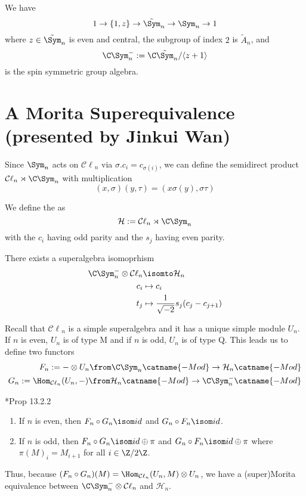 \documentclass[11pt,leqno,oneside]{amsbook}
\renewcommand{\H}{\mathcal{H}}
\newcommand{\Cl}{\mathcal{C\ell}} %
\numberwithin{thm}{section}
\begin{document}
\begin{example}
  We have \[
    1 \to \{1,z\} \to \tilde{\Sym}_n \to \Sym_n \to 1
  \]
  where \(z \in \tilde{\Sym}_n\) is even and central, the subgroup of
  index \(2\) is \(\tilde{A}_n\), and \[
    \C\Sym_n^- := \C \tilde{\Sym}_n/\langle z+1 \rangle
  \]
  is the spin symmetric group algebra.
\end{example}
\section{A Morita Superequivalence (presented by Jinkui Wan)}
Since \(\Sym_n\) acts on \(\Cl_n\) via \(\sigma.c_i = c_{\sigma(i)}\),
we can define the semidirect product \(\Cl_n \rtimes \C \Sym_n\) with
multiplication \[
  (x,\sigma)(y,\tau) = (x \sigma(y), \sigma \tau)
\]
\begin{defn}
  We define the  as \[
    \H := \Cl_n \rtimes \C \Sym_n
  \]
  with the \(c_i\) having odd parity and the \(s_j\) having even
  parity. 
\end{defn}
\begin{lem}
  There exists a superalgebra isomoprhism
  \begin{align*}
    \C\Sym_n^- \otimes \Cl_n & \isomto \H_n\\
    c_i & \mapsto c_i \\
    t_j & \mapsto \frac{1}{\sqrt{-2}} s_j(c_j-c_{j+1})
  \end{align*}
\end{lem}
Recall that \(\Cl_n\) is a simple superalgebra and it has a unique
simple module \(U_n\). If \(n\) is even, \(U_n\) is of type M and
if \(n\) is odd, \(U_n\) is of type Q. This leads us to define two
functors
\begin{align*}
  F_n := - \otimes U_n \from \C\Sym_n\catname{-Mod} \to
  \H_n\catname{-Mod}\\
  G_n := \Hom_{\Cl_n}(U_n,-) \from \H_n\catname{-Mod} \to \C\Sym_n^-\catname{-Mod}
\end{align*}
\begin{lem}
  \cite{kleshchev}*{Prop 13.2.2}
  \begin{enumerate}
  \item If \(n\) is even, then \(F_n \circ G_n \isom id\) and \(G_n
    \circ F_n \isom id\).
  \item If \(n\) is odd, then \(F_n \circ G_n \isom id \oplus \pi\)
    and \(G_n \circ F_n \isom id \oplus \pi\) where \(\pi(M)_i =
    M_{i+1}\) for all \(i \in \Z/2\Z\). 
  \end{enumerate}
\end{lem}
Thus, because \((F_n \circ G_n)(M) = \Hom_{\Cl_n}(U_n,M) \otimes
U_n\), we have a (super)Morita equivalence between \(\C\Sym_n^-
\otimes \Cl_n\) and \(\H_n\).
\end{document}
